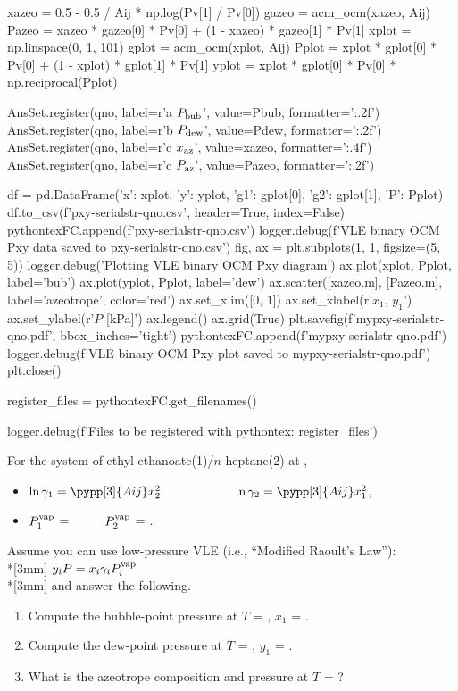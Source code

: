 \begin{pycode}
xazeo = 0.5 - 0.5 / Aij * np.log(Pv[1] / Pv[0])
gazeo = acm_ocm(xazeo, Aij)
Pazeo = xazeo * gazeo[0] * Pv[0] + (1 - xazeo) * gazeo[1] * Pv[1]
xplot = np.linspace(0, 1, 101)
gplot = acm_ocm(xplot, Aij)
Pplot = xplot * gplot[0] * Pv[0] + (1 - xplot) * gplot[1] * Pv[1]
yplot = xplot * gplot[0] * Pv[0] * np.reciprocal(Pplot)

AnsSet.register(qno, label=r'a \(P_{\rm bub}\)', value=Pbub, formatter='{:.2f}')
AnsSet.register(qno, label=r'b \(P_{\rm dew}\)', value=Pdew, formatter='{:.2f}')
AnsSet.register(qno, label=r'c \(x_{\rm az}\)', value=xazeo, formatter='{:.4f}')
AnsSet.register(qno, label=r'c \(P_{\rm az}\)', value=Pazeo, formatter='{:.2f}')

df = pd.DataFrame({'x': xplot, 'y': yplot, 'g1': gplot[0], 'g2': gplot[1], 'P': Pplot})
df.to_csv(f'pxy-{serialstr}-{qno}.csv', header=True, index=False)
pythontexFC.append(f'pxy-{serialstr}-{qno}.csv')
logger.debug(f'VLE binary OCM Pxy data saved to pxy-{serialstr}-{qno}.csv')
fig, ax = plt.subplots(1, 1, figsize=(5, 5))
logger.debug('Plotting VLE binary OCM Pxy diagram')
ax.plot(xplot, Pplot, label='bub')
ax.plot(yplot, Pplot, label='dew')
ax.scatter([xazeo.m], [Pazeo.m], label='azeotrope', color='red')
ax.set_xlim([0, 1])
ax.set_xlabel(r'$x_1$, $y_1$')
ax.set_ylabel(r'$P$ [kPa]')
ax.legend()
ax.grid(True)
plt.savefig(f'mypxy-{serialstr}-{qno}.pdf', bbox_inches='tight')
pythontexFC.append(f'mypxy-{serialstr}-{qno}.pdf')
logger.debug(f'VLE binary OCM Pxy plot saved to mypxy-{serialstr}-{qno}.pdf')
plt.close()

register_files = pythontexFC.get_filenames()

logger.debug(f'Files to be registered with pythontex: {register_files}')

\end{pycode}
For the system of ethyl ethanoate(1)/$n$-heptane(2) at ,
\begin{itemize}
\item[] $\ln\gamma_1 = \pypp[3]{Aij} x_2^2$ \ \ \ \ \ \ \ \ \ \ \ $\ln\gamma_2 = \pypp[3]{Aij} x_1^2$,
\item[] $P_1^{\rm vap}$ =  \ \ \ \ \  $P_2^{\rm vap}$ = .
\end{itemize}
Assume you can use low-pressure VLE (i.e., ``Modified Raoult's Law''):\\*[3mm]
$y_iP = x_i\gamma_iP_i^{\rm vap}$\\*[3mm]
and answer the following.
\begin{enumerate}
\item[(a)] Compute the bubble-point pressure at $T$ = , $x_1$ = .
\item[(b)] Compute the dew-point pressure at $T$ = , $y_1$ = .
\item[(c)] What is the azeotrope composition and pressure at $T$ = ?
\end{enumerate}

